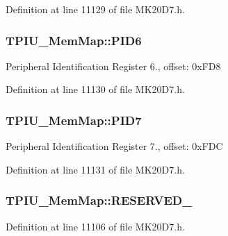 Definition at line 11129 of file M\+K20\+D7.\+h.

\subsubsection[{\texorpdfstring{P\+I\+D6}{PID6}}]{ T\+P\+I\+U\+\_\+\+Mem\+Map\+::\+P\+I\+D6}\hypertarget{struct_t_p_i_u___mem_map_a185d2c4d405ba5af792d84b79491b64c}{}\label{struct_t_p_i_u___mem_map_a185d2c4d405ba5af792d84b79491b64c}
Peripheral Identification Register 6., offset\+: 0x\+F\+D8 

Definition at line 11130 of file M\+K20\+D7.\+h.

\subsubsection[{\texorpdfstring{P\+I\+D7}{PID7}}]{ T\+P\+I\+U\+\_\+\+Mem\+Map\+::\+P\+I\+D7}\hypertarget{struct_t_p_i_u___mem_map_a1b71c0dea2679488ce2ba937ed68597a}{}\label{struct_t_p_i_u___mem_map_a1b71c0dea2679488ce2ba937ed68597a}
Peripheral Identification Register 7., offset\+: 0x\+F\+DC 

Definition at line 11131 of file M\+K20\+D7.\+h.

\subsubsection[{\texorpdfstring{R\+E\+S\+E\+R\+V\+E\+D\+\_\+0}{RESERVED_0}}]{ T\+P\+I\+U\+\_\+\+Mem\+Map\+::\+R\+E\+S\+E\+R\+V\+E\+D\+\_}\hypertarget{struct_t_p_i_u___mem_map_a736515788258b38e92719f5946ab480d}{}\label{struct_t_p_i_u___mem_map_a736515788258b38e92719f5946ab480d}


Definition at line 11106 of file M\+K20\+D7.\+h.

